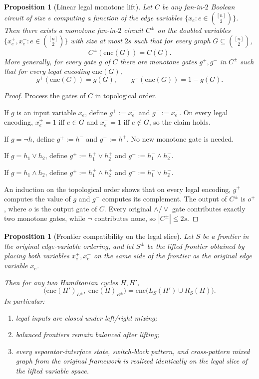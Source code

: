 \documentclass[11pt]{article}
\newtheorem{proposition}[theorem]{Proposition}
\begin{document}
\begin{proposition}[Linear legal monotone lift]
\label{prop:legal-monotone-lift}
Let $C$ be any fan-in-$2$ Boolean circuit of size $s$ computing a
function of the edge variables $\{x_e:e\in\binom{[n]}{2}\}$.  Then there
exists a monotone fan-in-$2$ circuit $C^{\pm}$ on the doubled variables
$\{x_e^+,x_e^-:e\in\binom{[n]}{2}\}$ with size at most $2s$ such that
for every graph $G\subseteq\binom{[n]}{2}$,
\[
C^{\pm}(\mathrm{enc}(G))=C(G).
\]
More generally, for every gate $g$ of $C$ there are monotone gates
$g^+,g^-$ in $C^{\pm}$ such that for every legal encoding
$\mathrm{enc}(G)$,
\[
g^+(\mathrm{enc}(G))=g(G),
\qquad
g^-(\mathrm{enc}(G))=1-g(G).
\]
\end{proposition}

\begin{proof}
Process the gates of $C$ in topological order.

If $g$ is an input variable $x_e$, define $g^+:=x_e^+$ and $g^-:=x_e^-$.
On every legal encoding, $x_e^+=1$ iff $e\in G$ and $x_e^-=1$ iff
$e\notin G$, so the claim holds.

If $g=\neg h$, define $g^+:=h^-$ and $g^-:=h^+$.  No new monotone gate
is needed.

If $g=h_1\vee h_2$, define $g^+:=h_1^+\vee h_2^+$ and
$g^-:=h_1^-\wedge h_2^-$.

If $g=h_1\wedge h_2$, define $g^+:=h_1^+\wedge h_2^+$ and
$g^-:=h_1^-\vee h_2^-$.

An induction on the topological order shows that on every legal encoding,
$g^+$ computes the value of $g$ and $g^-$ computes its complement.
The output of $C^{\pm}$ is $o^+$, where $o$ is the output gate of $C$.
Every original $\wedge/\vee$ gate contributes exactly two monotone gates,
while $\neg$ contributes none, so $|C^{\pm}|\le 2s$.
\end{proof}

\begin{proposition}[Frontier compatibility on the legal slice]
\label{prop:legal-frontier-compatibility}
Let $S$ be a frontier in the original edge-variable ordering, and let
$S^{\pm}$ be the lifted frontier obtained by placing both variables
$x_e^+,x_e^-$ on the same side of the frontier as the original edge
variable $x_e$.

Then for any two Hamiltonian cycles $H,H'$,
\[
\bigl(\mathrm{enc}(H')_{L^{\pm}},\;\mathrm{enc}(H)_{R^{\pm}}\bigr)
=\mathrm{enc}\bigl(L_S(H')\cup R_S(H)\bigr).
\]
In particular:
\begin{enumerate}
\item legal inputs are closed under left/right mixing;
\item balanced frontiers remain balanced after lifting;
\item every separator-interface state, switch-block pattern, and
  cross-pattern mixed graph from the original framework is realized
  identically on the legal slice of the lifted variable space.
\end{enumerate}
\end{proposition}
\end{document}
